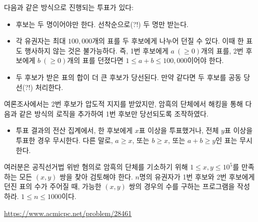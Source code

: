 \begin{problem}
    다음과 같은 방식으로 진행되는 투표가 있다:
    \begin{itemize}
        \item 후보는 두 명이어야만 한다. 선착순으로(?!) 두 명만 받는다.
        \item 각 유권자는 최대 $100,000$개의 표를 두 후보에게 나누어 던질 수 있다. 이때 한 표도 행사하지 않는 것은 불가능하다. 즉, 1번 후보에게 $a~(\geq 0)$개의 표를, 2번 후보에게 $b~(\geq 0)$개의 표를 던졌다면 $1 \leq a+b \leq 100,000$이어야 한다.
        \item 두 후보가 받은 표의 합이 더 큰 후보가 당선된다. 만약 같다면 두 후보를 공동 당선(?!) 처리한다.
    \end{itemize}
    여론조사에서는 2번 후보가 압도적 지지를 받았지만, 암흑의 단체에서 해킹을 통해 다음과 같은 방식의 로직을 추가하여 1번 후보만 당선되도록 조작하였다.
    \begin{itemize}
        \item 투표 결과의 전산 집계에서, 한 후보에게 $x$표 이상을 투표했거나, 전체 $y$표 이상을 투표한 경우 무시한다. 다른 말로, $a \geq x$, 또는 $b \geq x$, 또는 $a+b \geq y$인 표는 무시한다.
    \end{itemize}
    여러분은 공직선거법 위반 혐의로 암흑의 단체를 기소하기 위해 $1 \leq x, y \leq 10^5$를 만족하는 모든 $(x, y)$ 쌍을 찾아 검토해야 한다. $n$명의 유권자가 1번 후보와 2번 후보에게 던진 표의 수가 주어질 때, 가능한 $(x, y)$ 쌍의 경우의 수를 구하는 프로그램을 작성하라. $1 \leq n \leq 1000$이다.
\end{problem}

\begin{problem} \url{https://www.acmicpc.net/problem/28461} \end{problem}